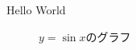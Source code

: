 \documentclass[uplatex,dvipdfmx,a4paper]{jsarticle}
\begin{document}
Hello World

\begin{figure}[h]
  \centering
  
  \caption{$y = \sin{x}$のグラフ}
\end{figure}
\end{document}
